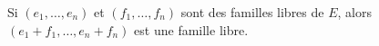 Si $(e_1,\ldots,e_n)$ et $(f_1,\ldots,f_n)$ sont des familles libres de $E$, alors $(e_1+f_1,\ldots,e_n+f_n)$ est une famille libre.

\begin{reponses}
\end{reponses}

